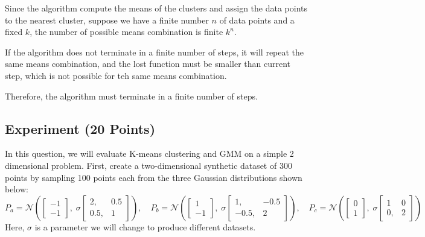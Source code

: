 \documentclass[a4paper]{article}
\newcounter{thm}
\newcommand{\Ncal}{\mathcal{N}}
\theoremstyle{definition}
\newenvironment{soln}{
    \leavevmode\color{blue}\ignorespaces
}{}
\begin{document}
\begin{enumerate}
	      \begin{soln}
		      Since the algorithm compute the means of the clusters and assign the data points to the nearest cluster, suppose we have a finite number $n$ of data points and a fixed $k$, the number of possible means combination is finite $k^n$.

		      If the algorithm does not terminate in a finite number of steps, it will repeat the same means combination, and the lost function must be smaller than current step, which is not possible for teh same means combination.

		      Therefore, the algorithm must terminate in a finite number of steps.

	      \end{soln}

\end{enumerate}



\pagebreak
\subsection{Experiment (20 Points)}

In this question, we will evaluate
K-means clustering and GMM on a simple 2 dimensional problem.
First, create a two-dimensional synthetic dataset of 300 points by sampling 100 points each from the
three Gaussian distributions shown below:
\[
	P_a = \Ncal\left(
	\begin{bmatrix}
			-1 \\ -1
		\end{bmatrix},
	\;
	\sigma\begin{bmatrix}
			2, & 0.5 \\ 0.5, &1
		\end{bmatrix}
	\right),
	\quad
	P_b = \Ncal\left(
	\begin{bmatrix}
			1 \\ -1
		\end{bmatrix},
	\;
	\sigma\begin{bmatrix}
			1, & -0.5 \\ -0.5, &2
		\end{bmatrix}
	\right),
	\quad
	P_c = \Ncal\left(
	\begin{bmatrix}
			0 \\ 1
		\end{bmatrix},
	\;
	\sigma\begin{bmatrix}
			1 & 0 \\ 0, &2
		\end{bmatrix}
	\right)
\]
Here, $\sigma$ is a parameter we will change to produce different datasets.\\
\end{document}
